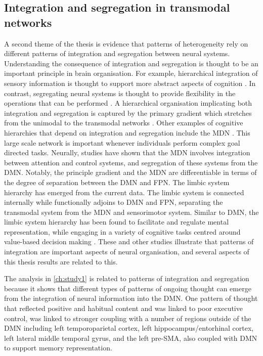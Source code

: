 \subsection{Integration and segregation in transmodal networks}

A second theme of the thesis is evidence that patterns of heterogeneity rely on different patterns of integration and segregation between neural systems. Understanding the consequence of integration and segregation is thought to be an important principle in brain organisation. For example, hierarchical integration of sensory information is thought to support more abstract aspects of cognition \cite{Mesulam1998}. In contrast, segregating neural systems is thought to provide flexibility in the operations that can be performed \cite{Buckner2013}. A hierarchical organisation implicating both integration and segregation is captured by the primary gradient which stretches from the unimodal to the transmodal networks \cite{Margulies2016}. Other examples of cognitive hierarchies that depend on integration and segregation include the MDN \cite{Duncan2010}. This large scale network is important whenever individuals perform complex goal directed tasks. Neurally, studies have shown that the MDN involves integration between attention and control systems, and segregation of these systems from the DMN. Notably, the principle gradient and the MDN are differentiable in terms of the degree of separation between the DMN and FPN. The limbic system hierarchy has emerged from the current data. The limbic system is connected internally while functionally adjoins to DMN and FPN, separating the transmodal system from the MDN and sensorimotor system. Similar to DMN, the limbic system hierarchy has been found to facilitate and regulate mental representation, while engaging in a variety of cognitive tasks centred around value-based decision making \cite{Kleckner2017}. 
These and other studies illustrate that patterns of integration are important aspects of neural organisation, and several aspects of this thesis results are related to this. 

The analysis in \cref{ch:study1} is related to patterns of integration and segregation because it shows that different types of patterns of ongoing thought can emerge from the integration of neural information into the DMN. One pattern of thought that reflected positive and habitual content and was linked to poor executive control, was linked to stronger coupling with a number of regions outside of the DMN including left temporoparietal cortex, left hippocampus/entorhinal cortex, left lateral middle temporal gyrus, and the left pre-SMA, also coupled with DMN to support memory representation. 

